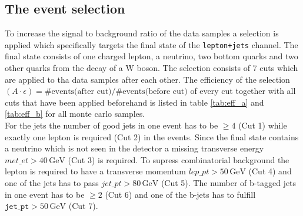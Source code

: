\subsection{The event selection}
To increase the signal to background ratio of the data samples a selection is applied which specifically targets the final state of the \texttt{lepton+jets} 
channel. The final state consists of one charged lepton, a neutrino, two bottom quarks and two other quarks from the 
decay of a W boson. The selection consists of 7 cuts which are applied to tha data samples after each other. 
The efficiency of the selection $(A \cdot \epsilon) = \# \text{events(after cut)} / \# \text{events(before cut)}$ of every cut together with all 
cuts that have been applied beforehand is listed in table \ref{tab:eff_a} and \ref{tab:eff_b} for all monte carlo samples.\\
For the jets the number of good jets in one event has to be $\geq 4$ (Cut 1) while exactly one lepton is required (Cut 2) 
in the events. Since the final state contains a neutrino which is not seen in the detector a missing 
transverse energy $met\_et > 40 \, \si{\giga\eV}$ (Cut 3) is required. To supress combinatorial background 
the lepton is required to have a transverse momentum $lep\_pt > 50 \, \si{\giga\eV}$ (Cut 4) and one of 
the jets has to pass $jet\_pt > 80 \, \si{\giga\eV}$ (Cut 5). The number of b-tagged jets in one event has to be 
$\geq 2$ (Cut 6) and one of the b-jets has to fulfill $\texttt{jet\_pt} > 50 \, \si{\giga\eV}$ (Cut 7).
